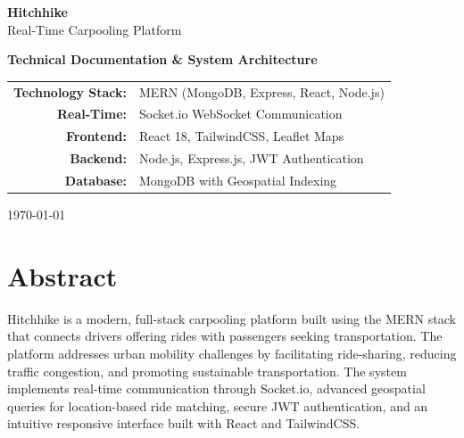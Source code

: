 \documentclass[12pt,a4paper]{article}
\begin{document}
\begin{titlepage}
    \centering
    \vspace*{2cm}
    
    {\Huge\bfseries Hitchhike\\[0.5cm]}
    {\LARGE Real-Time Carpooling Platform\\[0.2cm]}
    \vspace{1cm}
    
    {\Large\textbf{Technical Documentation \& System Architecture}\\[2cm]}
    
    \vspace{1.5cm}
    
    \begin{tabular}{rl}
        \textbf{Technology Stack:} & MERN (MongoDB, Express, React, Node.js) \\[0.3cm]
        \textbf{Real-Time:} & Socket.io WebSocket Communication \\[0.3cm]
        \textbf{Frontend:} & React 18, TailwindCSS, Leaflet Maps \\[0.3cm]
        \textbf{Backend:} & Node.js, Express.js, JWT Authentication \\[0.3cm]
        \textbf{Database:} & MongoDB with Geospatial Indexing \\[0.3cm]
    \end{tabular}
    
    \vfill
    
    {\large \today\\[2cm]}
    
\end{titlepage}

\tableofcontents
\newpage

\section*{Abstract}

Hitchhike is a modern, full-stack carpooling platform built using the MERN stack that connects drivers offering rides with passengers seeking transportation. The platform addresses urban mobility challenges by facilitating ride-sharing, reducing traffic congestion, and promoting sustainable transportation. The system implements real-time communication through Socket.io, advanced geospatial queries for location-based ride matching, secure JWT authentication, and an intuitive responsive interface built with React and TailwindCSS.
\end{document}
